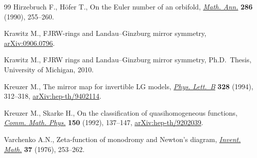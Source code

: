 \documentclass[11pt]{article}
\numberwithin{equation}{section}
\numberwithin{equation}{section}
\begin{document}
\begin{thebibliography}{99}
Hirzebruch F., H\"ofer T., On the {E}uler number of an orbifold, \href{https://doi.org/10.1007/BF01453575}{\textit{Math.
 Ann.}} \textbf{286} (1990), 255--260.

Krawitz M., FJRW-rings and {L}andau--{G}inzburg mirror symmetry,
 \href{https://arxiv.org/abs/0906.0796}{arXiv:0906.0796}.

Krawitz M., F{JRW} rings and {L}andau--{G}inzburg mirror symmetry, Ph.D.~Thesis, {U}niversity of Michigan, 2010.

Kreuzer M., The mirror map for invertible {LG} models, \href{https://doi.org/10.1016/0370-2693(94)91485-0}{\textit{Phys. Lett.~B}}
 \textbf{328} (1994), 312--318, \href{https://arxiv.org/abs/hep-th/9402114}{arXiv:hep-th/9402114}.

Kreuzer M., Skarke H., On the classification of quasihomogeneous functions,
 \href{https://doi.org/10.1007/BF02096569}{\textit{Comm. Math. Phys.}} \textbf{150} (1992), 137--147,
 \href{https://arxiv.org/abs/hep-th/9202039}{arXiv:hep-th/9202039}.

Varchenko A.N., Zeta-function of monodromy and {N}ewton's diagram,
 \href{https://doi.org/10.1007/BF01390323}{\textit{Invent. Math.}} \textbf{37} (1976), 253--262.

\end{thebibliography}
\end{document}
